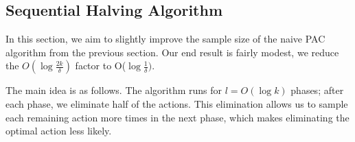 \subsection{Sequential Halving Algorithm}

In this section, we aim to slightly improve the sample size of the naive PAC algorithm from the previous section. Our end result is fairly modest, we  reduce the $ O(\log\frac{2k}{\delta})$ factor to O($\log\frac{1}{\delta})$.

The main idea is as follows. The algorithm runs for $l=O(\log k)$ phases; after each phase, we
eliminate half of the actions. This elimination allows us to sample
each remaining action more times in the next phase, which makes eliminating the optimal action less likely.

















